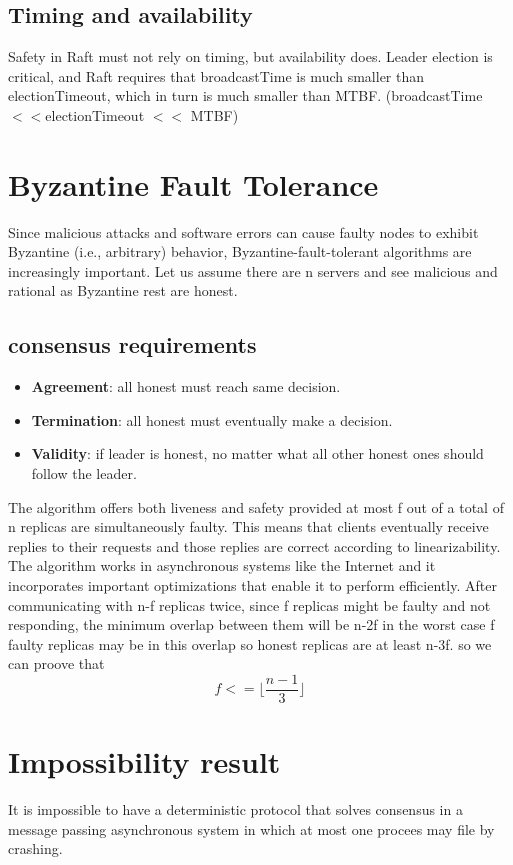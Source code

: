 \documentclass{article}
\begin{document}
\subsection{Timing and availability}
Safety in Raft must not rely on timing, but availability does. Leader election is critical, and Raft requires that broadcastTime is much smaller than electionTimeout, which in turn is much smaller than MTBF. (broadcastTime $<< $electionTimeout $<<$ MTBF)
\section{Byzantine Fault Tolerance}
Since malicious attacks and software errors can cause faulty nodes to exhibit Byzantine (i.e., arbitrary) behavior, Byzantine-fault-tolerant algorithms are increasingly important.
Let us assume there are n servers and see malicious and rational 
as Byzantine rest are honest.
\subsection{consensus requirements}
\begin{itemize}
    \item \textbf{Agreement}: all honest must reach same decision.
    \item \textbf{Termination}: all honest must eventually make a decision.
    \item \textbf{Validity}: if leader is honest, no matter what all other honest ones should follow the leader.
\end{itemize}
The algorithm offers both liveness and safety
provided at most f out of a total of n replicas are simultaneously faulty. This means that clients eventually receive replies to their requests and those replies are correct according to linearizability. The algorithm works in asynchronous systems like the Internet and it
incorporates important optimizations that enable it to
perform efficiently. 
After communicating with n-f replicas twice, since f replicas might be faulty and not responding, the minimum overlap between 
them will be n-2f in the worst case f faulty replicas may be in this overlap so honest replicas are at least n-3f. so we can proove that 
$$ f <= \lfloor \frac{n -1 }{3} \rfloor$$
\section{Impossibility result}
It is impossible to have a deterministic protocol that solves consensus in a message passing asynchronous system in which at most one procees may file by crashing.
\end{document}

